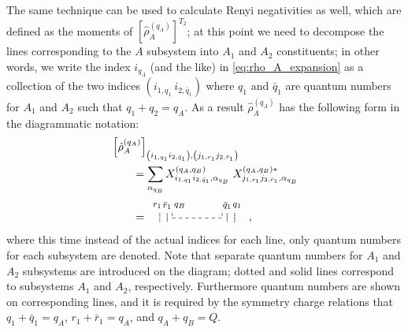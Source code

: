\documentclass[aps,pra,reprint,superscriptaddress,twocolumn,notitlepage]{revtex4-1}
\numberwithin{equation}{section}
\begin{document}
The same technique can be used to calculate Renyi negativities as well, which are defined as the moments of $\left[ \hat \rho_{A}^{(q_A)} \right]^{T_2}$; at this point we need to decompose the lines corresponding to the $A$ subsystem into $A_1$ and $A_2$ constituents; 
in other words, we write the index  $ i_{q_A}$ (and the like) in \eqref{eq:rho_A_expansion} as a collection of the two indices $\left( i_{1,q_1} \ i_{2, \bar{q}_1} \right)$ where $q_1$ and $\bar{q}_1$ are quantum numbers for $A_1$ and $A_2$ such that $q_1 + q_2 = q_A$. As a result $\hat \rho_{A}^{(q_A)}$
has the following form in the diagrammatic notation:
%
\begin{equation}
\begin{aligned}
     &\left[\hat \rho_{A}^{(q_A)}\right]_{ \left( i_{1,q_1} i_{2,\bar{q}_1} \right) , \left( j_{1,r_1} j_{2,\bar{r}_1} \right) } 
    \\
    & \qquad = \sum_{\alpha_{q_B}} 
     X_{i_{1,q_1} i_{2,\bar{q}_1} , \alpha_{q_B}}^{(q_A, q_B)}
     \;
      X_{j_{1,r_1} j_{2,\bar{r}_1} , \alpha_{q_B}}^{(q_A, q_B)\ast}
      \\
    &\qquad =
    \,
    \tikz[scale=0.8,baseline=-0.5ex]{
    \draw[dashed] (0.,0.2)-- (0,0);
    \draw[dashed] (0,0) -- (2,0);
    \draw[dashed]  (2,0.2) -- (2,0);
    \draw (-0.2,0.2)-- (-0.2,-0.15);
    \draw (2.2,-0.15)-- (2.2,0.2);
    \draw[densely dotted,thick] (-0.5,0.2)-- (-0.5,-0.15);
    \draw[densely dotted,thick] (2.5,-0.15)-- (2.5,0.2);
    \draw (-0.6,0.5) circle (0.) node[anchor=center] {\footnotesize$r_1$};
    \draw (-0.2,0.5) circle (0.) node[anchor=center] {\footnotesize$\bar{r}_1$};
    \draw (2.2,0.5) circle (0.) node[anchor=center] {\footnotesize$\bar{q}_1$};
    \draw (2.6,0.5) circle (0.) node[anchor=center] {\footnotesize$q_1$};
    \draw (0.3,0.5) circle (0.) node[anchor=center] {\footnotesize$ q_B $};
    }\ ,
\end{aligned}
\end{equation}
%
where this time instead of the actual indices for each line, only quantum numbers for each subsystem are denoted. Note that separate quantum numbers for $A_1$ and $A_2$ subsystems are introduced on the diagram; dotted and solid lines correspond to subsystems $A_1$ and $A_2$, respectively. Furthermore quantum numbers are shown on corresponding lines, and it is required by the symmetry charge relations that $q_1 +\bar{q}_1 = q_A$, $r_1+ \bar{r}_1 = q_A$, and $q_A + q_B = Q$.
\end{document}
